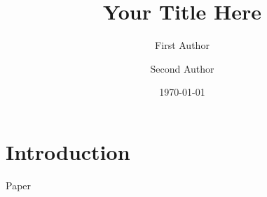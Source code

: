 \documentclass[aip, numerical, preprint]{revtex4-2}
\begin{document}
\title{Your Title Here}

\author{First Author} 
\author{Second Author} 

\date{\today}

\maketitle

\section{Introduction}

Paper
\end{document}
